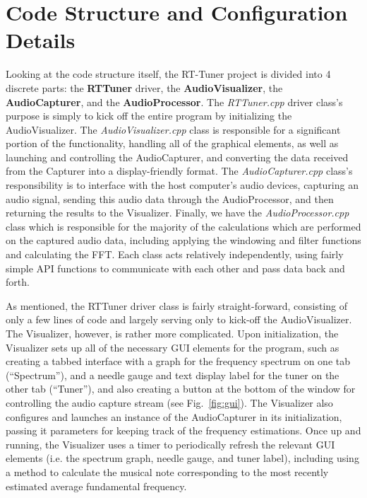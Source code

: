 \documentclass[12pt]{report}
\begin{document}
\section{Code Structure and Configuration Details}
\indent Looking at the code structure itself, the RT-Tuner project is divided into 4 discrete parts: the {\bf RTTuner} driver, the {\bf AudioVisualizer}, the {\bf AudioCapturer}, and the {\bf AudioProcessor}. The \emph{RTTuner.cpp} driver class's purpose is simply to kick off the entire program by initializing the AudioVisualizer. The \emph{AudioVisualizer.cpp} class is responsible for a significant portion of the functionality, handling all of the graphical elements, as well as launching and controlling the AudioCapturer, and converting the data received from the Capturer into a display-friendly format. The \emph{AudioCapturer.cpp} class's responsibility is to interface with the host computer's audio devices, capturing an audio signal, sending this audio data through the AudioProcessor, and then returning the results to the Visualizer. Finally, we have the \emph{AudioProcessor.cpp} class which is responsible for the majority of the calculations which are performed on the captured audio data, including applying the windowing and filter functions and calculating the FFT. Each class acts relatively independently, using fairly simple API functions to communicate with each other and pass data back and forth.

\indent As mentioned, the RTTuner driver class is fairly straight-forward, consisting of only a few lines of code and largely serving only to kick-off the AudioVisualizer. The Visualizer, however, is rather more complicated. Upon initialization, the Visualizer sets up all of the necessary GUI elements for the program, such as creating a tabbed interface with a graph for the frequency spectrum on one tab (``Spectrum''), and a needle gauge and text display label for the tuner on the other tab (``Tuner''), and also creating a button at the bottom of the window for controlling the audio capture stream (see Fig.~\ref{fig:gui}). The Visualizer also configures and launches an instance of the AudioCapturer in its initialization, passing it parameters for keeping track of the frequency estimations. Once up and running, the Visualizer uses a timer to periodically refresh the relevant GUI elements (i.e. the spectrum graph, needle gauge, and tuner label), including using a method to calculate the musical note corresponding to the most recently estimated average fundamental frequency.
\end{document}
